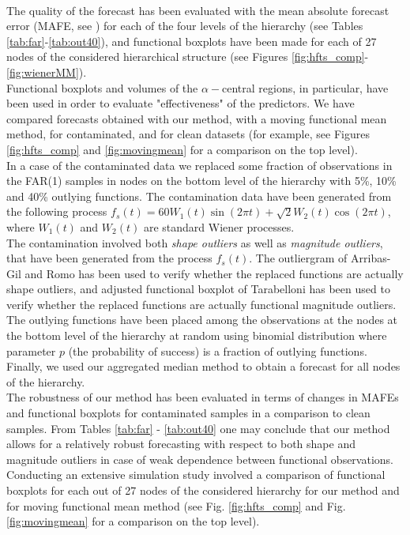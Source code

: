 \documentclass[12pt,a4paper]{article}
\numberwithin{equation}{section}
\begin{document}
\\ The quality of the forecast has been evaluated with the mean absolute forecast error (MAFE, see \cite{Shang}) for each of the four levels of the hierarchy (see Tables \ref{tab:far}-\ref{tab:out40}), and functional boxplots have been made for each of 27 nodes of the considered hierarchical structure (see Figures \ref{fig:hfts_comp}-\ref{fig:wienerMM}). 
\\ Functional boxplots and volumes of the $\alpha-$central regions, in particular, have been used in order to evaluate "effectiveness" of the predictors. We have compared forecasts obtained with our method, with a moving functional mean method, for contaminated, and for clean datasets (for example, see Figures \ref{fig:hfts_comp} and \ref{fig:movingmean} for a comparison on the top level).
\\ In a case of the contaminated data we replaced some fraction of observations in the FAR(1) samples in nodes on the bottom level of the hierarchy with 5\%, 10\% and 40\% outlying functions.
The contamination data have been generated from the following process 
$f_s(t)=60W_1(t)\sin(2\pi t)+\sqrt{2}W_2(t)\cos(2\pi t)$, where $W_1(t)$ and $W_2(t)$ are standard Wiener processes.
\\The contamination involved both \emph{shape outliers} as well as \emph{magnitude outliers}, that have been generated from the process $f_s(t)$. 
The outliergram of Arribas-Gil and Romo \cite{Arribas} has been used to verify whether the replaced functions are actually shape outliers, and adjusted functional boxplot of Tarabelloni \cite{Tarabelloni} has been used to verify whether the replaced functions are actually functional magnitude outliers.
The outlying functions have been placed among the observations at the nodes at the bottom level of the hierarchy at random using binomial distribution where parameter $p$ (the probability of success) is a fraction of outlying functions.
Finally, we used our aggregated median method to obtain a forecast for all nodes of the hierarchy. 
\\ The robustness of our method has been evaluated in terms of changes in MAFEs and functional boxplots for contaminated samples in a comparison to clean samples.
From Tables \ref{tab:far} - \ref{tab:out40} one may conclude that our method allows for a relatively robust forecasting with respect to both shape and magnitude outliers in case of weak dependence between functional observations. Conducting an extensive simulation study involved a comparison of functional boxplots for each out of 27 nodes of the considered hierarchy for our method and for moving functional mean method (see Fig. \ref{fig:hfts_comp} and Fig. \ref{fig:movingmean} for a comparison on the top level).
\end{document}
